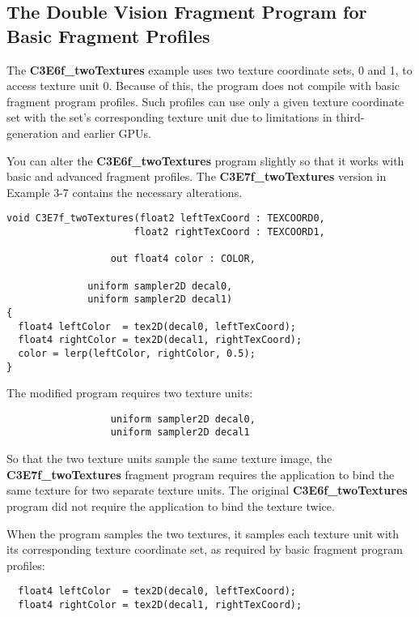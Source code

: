 \documentclass[../main.tex]{subfiles}
\begin{document}
\subsection*{The Double Vision Fragment Program for Basic Fragment Profiles}

The \textbf{C3E6f_twoTextures} example uses two texture coordinate sets, 0 and 1, to access texture unit 0. Because of this, the program does not compile with basic fragment program profiles. Such profiles can use only a given texture coordinate set with the set's corresponding texture unit due to limitations in third-generation and earlier GPUs.

You can alter the \textbf{C3E6f_twoTextures} program slightly so that it works with basic and advanced fragment profiles. The \textbf{C3E7f_twoTextures} version in Example 3-7 contains the necessary alterations.

\FloatBarrier
\begin{lstlisting}[caption=Example 3-7. The \textbf{C3E7f_twoTextures} Fragment Program]
void C3E7f_twoTextures(float2 leftTexCoord : TEXCOORD0,
                      float2 rightTexCoord : TEXCOORD1,

                  out float4 color : COLOR,

              uniform sampler2D decal0,
              uniform sampler2D decal1)
{
  float4 leftColor  = tex2D(decal0, leftTexCoord);
  float4 rightColor = tex2D(decal1, rightTexCoord);
  color = lerp(leftColor, rightColor, 0.5);
}
\end{lstlisting}
\FloatBarrier

The modified program requires two texture units:

\FloatBarrier
\begin{lstlisting}                  
                  uniform sampler2D decal0,
                  uniform sampler2D decal1
\end{lstlisting}
\FloatBarrier

So that the two texture units sample the same texture image, the \textbf{C3E7f_twoTextures} fragment program requires the application to bind the same texture for two separate texture units. The original \textbf{C3E6f_twoTextures} program did not require the application to bind the texture twice.

When the program samples the two textures, it samples each texture unit with its corresponding texture coordinate set, as required by basic fragment program profiles:

\FloatBarrier
\begin{lstlisting} 
  float4 leftColor  = tex2D(decal0, leftTexCoord);
  float4 rightColor = tex2D(decal1, rightTexCoord);
\end{lstlisting}
\FloatBarrier
\end{document}

